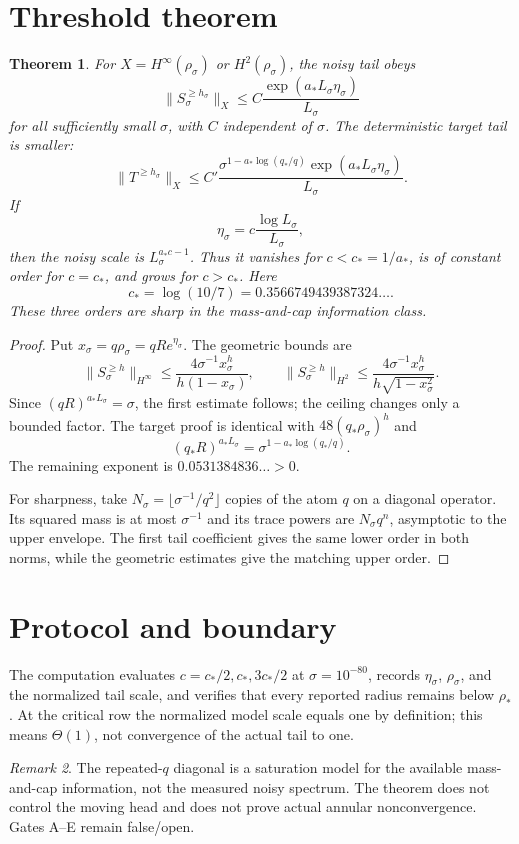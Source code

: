 \documentclass[11pt]{article}
\newtheorem{theorem}{Theorem}[section]
\theoremstyle{remark}\newtheorem{remark}[theorem]{Remark}
\begin{document}
\section{Threshold theorem}
\begin{theorem}\label{thm:threshold}
For $X=H^\infty(\rho_\sigma)$ or $H^2(\rho_\sigma)$, the noisy tail obeys
\[
 \|S_\sigma^{\ge h_\sigma}\|_X
 \le C\frac{\exp(a_*L_\sigma\eta_\sigma)}{L_\sigma}
\]
for all sufficiently small $\sigma$, with $C$ independent of $\sigma$.
The deterministic target tail is smaller:
\[
 \|T^{\ge h_\sigma}\|_X
 \le C'
 \frac{\sigma^{1-a_*\log(q_*/q)}
 \exp(a_*L_\sigma\eta_\sigma)}{L_\sigma}.
\]
If
\[
 \eta_\sigma=c\frac{\log L_\sigma}{L_\sigma},
\]
then the noisy scale is $L_\sigma^{a_*c-1}$.  Thus it vanishes for
$c<c_*=1/a_*$, is of constant order for $c=c_*$, and grows for $c>c_*$.
Here
\[
 c_*=\log(10/7)=0.3566749439387324\ldots.
\]
These three orders are sharp in the mass-and-cap information class.
\end{theorem}
\begin{proof}
Put $x_\sigma=q\rho_\sigma=qR e^{\eta_\sigma}$.  The geometric bounds are
\[
 \|S_\sigma^{\ge h}\|_{H^\infty}
 \le\frac{4\sigma^{-1}x_\sigma^h}{h(1-x_\sigma)},\qquad
 \|S_\sigma^{\ge h}\|_{H^2}
 \le\frac{4\sigma^{-1}x_\sigma^h}
 {h\sqrt{1-x_\sigma^2}}.
\]
Since $(qR)^{a_*L_\sigma}=\sigma$, the first estimate follows; the ceiling
changes only a bounded factor.  The target proof is identical with
$48(q_*\rho_\sigma)^h$ and
\[
 (q_*R)^{a_*L_\sigma}
 =\sigma^{1-a_*\log(q_*/q)}.
\]
The remaining exponent is $0.0531384836\ldots>0$.

For sharpness, take $N_\sigma=\lfloor\sigma^{-1}/q^2\rfloor$ copies of the
atom $q$ on a diagonal operator.  Its squared mass is at most
$\sigma^{-1}$ and its trace powers are $N_\sigma q^n$, asymptotic to the
upper envelope.  The first tail coefficient gives the same lower order in
both norms, while the geometric estimates give the matching upper order.
\end{proof}

\section{Protocol and boundary}
The computation evaluates $c=c_*/2,c_*,3c_*/2$ at $\sigma=10^{-80}$,
records $\eta_\sigma$, $\rho_\sigma$, and the normalized tail scale, and
verifies that every reported radius remains below $\rho_*$.  At the critical
row the normalized model scale equals one by definition; this means
$\Theta(1)$, not convergence of the actual tail to one.

\begin{remark}
The repeated-$q$ diagonal is a saturation model for the available
mass-and-cap information, not the measured noisy spectrum.  The theorem
does not control the moving head and does not prove actual annular
nonconvergence.  Gates A--E remain false/open.
\end{remark}
\end{document}
